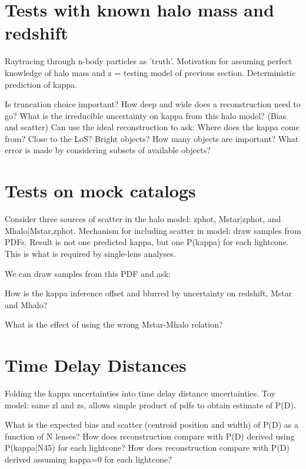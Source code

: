 \documentclass[useAMS,usenatbib]{mn2e}
\begin{document}
\section{Tests with known halo mass and redshift}
\label{sec:knownMh+z} 

Raytracing through n-body particles as 'truth'. Motivation for assuming perfect
knowledge of halo mass and z = testing model of previous section. Deterministic
prediction of kappa.

Is truncation choice important? How deep and wide does a reconstruction need to
go? What is the irreducible uncertainty on kappa from this halo model? (Bias and
scatter) Can use the ideal reconstruction to ask: Where does the kappa come
from? Close to the LoS? Bright objects? How many objects are important? What
error is made by considering subsets of available objects? 



\section{Tests on mock catalogs}
\label{sec:obsMstar+z}

Consider three sources of scatter in the halo model: zphot, Mstar|zphot, and
Mhalo|Mstar,zphot. Mechanism for including scatter in model: draw samples from
PDFs. Result is not one predicted kappa, but one P(kappa) for each lightcone.
This is what is required by single-lens analyses. 

We can draw samples from this PDF and ask:

How is the kappa inference offset and blurred by uncertainty on redshift, Mstar
and Mhalo? 

What is the effect of using the wrong Mstar-Mhalo relation? 



\section{Time Delay Distances}
\label{sec:} 

Folding the kappa uncertainties into time delay distance uncertainties. Toy
model: same zl and zs, allows simple product of pdfs to obtain estimate of P(D).

What is the expected bias and scatter (centroid position and width) of P(D) as a
function of N lenses? How does reconstruction compare with P(D) derived using
P(kappa|N45) for each lightcone? How does reconstruction compare with P(D)
derived assuming kappa=0 for each lightcone?
\end{document}
